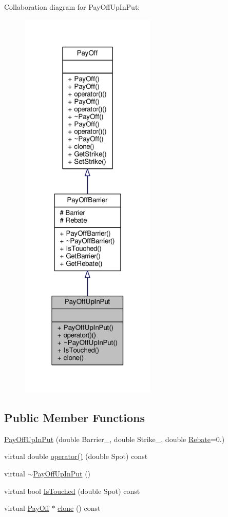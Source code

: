 Collaboration diagram for Pay\+Off\+Up\+In\+Put\+:
\nopagebreak
\begin{figure}[H]
\begin{center}
\leavevmode
\includegraphics[width=184pt]{classPayOffUpInPut__coll__graph}
\end{center}
\end{figure}
\subsection*{Public Member Functions}
\begin{DoxyCompactItemize}
\item 
\hyperlink{classPayOffUpInPut_a1f14c7bbf9924c6999f3fbc2ba849757}{Pay\+Off\+Up\+In\+Put} (double Barrier\+\_\+, double Strike\+\_\+, double \hyperlink{classPayOffBarrier_aca3ea631dcdb28a1df971b74774e41f8}{Rebate}=0.)
\item 
virtual double \hyperlink{classPayOffUpInPut_ad5173b4e12554d96780b4c6d10818daf}{operator()} (double Spot) const
\item 
virtual \hyperlink{classPayOffUpInPut_a38eb2ef3bf0f605bde25ad862d226264}{$\sim$\+Pay\+Off\+Up\+In\+Put} ()
\item 
virtual bool \hyperlink{classPayOffUpInPut_a8e8079a2508dfc533f60ca52b496f603}{Is\+Touched} (double Spot) const
\item 
virtual \hyperlink{classPayOff}{Pay\+Off} $\ast$ \hyperlink{classPayOffUpInPut_ab56f32e37426f6662448aeaef9c8b4eb}{clone} () const
\end{DoxyCompactItemize}
